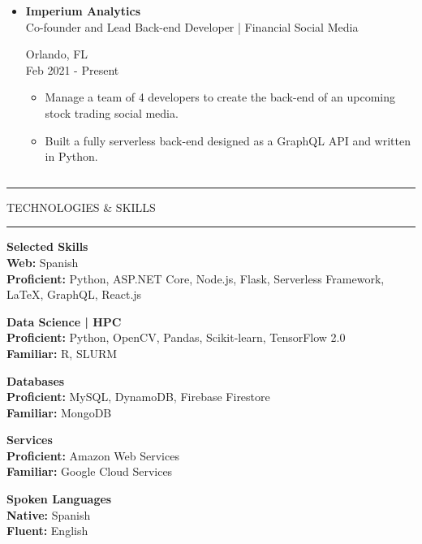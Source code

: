 \documentclass{article}
\newcommand{\makeminipage}[4]{
    \begin{minipage}[c]{.7\linewidth} 
        \flushleft #1 \\ #2
    \end{minipage} \hfill
    \begin{minipage}[c]{.29\linewidth}
        \flushright #3 \\ #4
    \end{minipage}
}
\newcommand{\makesection}[1]{\hrule\vskip1mm\uppercase{#1}\vskip1mm\hrule}
\begin{document}
\begin{minipage}[t]{.69\linewidth}
\begin{itemize}[leftmargin=.35cm]
        \item \makeminipage
            {\textbf{Imperium Analytics}}
            {Co-founder and Lead Back-end Developer | Financial Social Media}
            {Orlando, FL}
            {Feb 2021 - Present}
            \vspace*{-1.5mm}
            \begin{itemize}[leftmargin=.35cm]
                \item Manage a team of 4 developers to create the back-end of an upcoming stock trading social media.
                \item Built a fully serverless back-end designed as a GraphQL API and written in Python.
            \end{itemize}
    \end{itemize}
\end{minipage}
\begin{minipage}[t]{.01\linewidth}$ $\end{minipage}
\begin{minipage}[t]{.29\linewidth}
    \makesection{Technologies \& Skills}
    \vspace*{3.75mm}

    \textbf{Selected Skills} \\
    \textbf{Web:} Spanish \\
    \textbf{Proficient:} Python, ASP.NET Core, Node.js, Flask, Serverless Framework, \LaTeX, GraphQL, React.js
    \vspace*{2mm}

    \textbf{Data Science | HPC} \\
    \textbf{Proficient:} Python, OpenCV, Pandas, Scikit-learn, TensorFlow 2.0 \\
    \textbf{Familiar:} R, SLURM
    \vspace*{2mm}
    
    \textbf{Databases} \\
    \textbf{Proficient:} MySQL, DynamoDB, Firebase Firestore \\
    \textbf{Familiar:} MongoDB
    \vspace*{2mm}

    \textbf{Services} \\
    \textbf{Proficient:} Amazon Web Services \\
    \textbf{Familiar:} Google Cloud Services
    \vspace*{2mm}

    \textbf{Spoken Languages} \\
    \textbf{Native:} Spanish \\
    \textbf{Fluent:} English
\end{minipage}
\vspace*{2mm}
\end{document}
